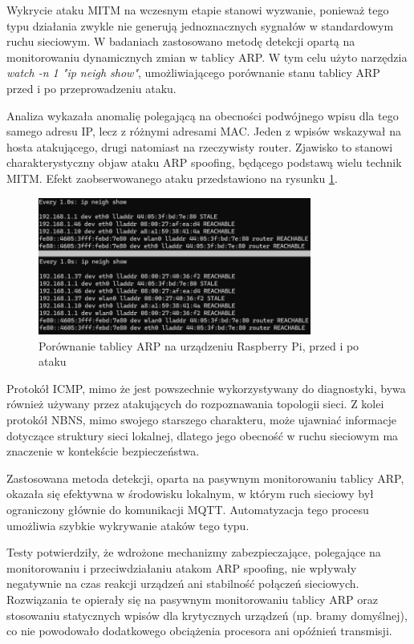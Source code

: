 Wykrycie ataku MITM na wczesnym etapie stanowi wyzwanie, ponieważ tego typu działania zwykle nie generują jednoznacznych sygnałów w standardowym ruchu sieciowym. W badaniach zastosowano metodę detekcji opartą na monitorowaniu dynamicznych zmian w tablicy ARP. W tym celu użyto narzędzia \textit{watch -n 1 "ip neigh show"}, umożliwiającego porównanie stanu tablicy ARP przed i po przeprowadzeniu ataku.

Analiza wykazała anomalię polegającą na obecności podwójnego wpisu dla tego samego adresu IP, lecz z różnymi adresami MAC. Jeden z wpisów wskazywał na hosta atakującego, drugi natomiast na rzeczywisty router. Zjawisko to stanowi charakterystyczny objaw ataku ARP spoofing, będącego podstawą wielu technik MITM. Efekt zaobserwowanego ataku przedstawiono na rysunku \ref{fig:Porównanie tablicy arp na urządzeniu Raspberry Pi, przed i po ataku}.
\begin{figure}[h]
    \centering
    \includegraphics[width=0.8\textwidth]{pictures/arp-mitm.png}
    \caption{Porównanie tablicy ARP na urządzeniu Raspberry Pi, przed i po ataku}
    \label{fig:Porównanie tablicy arp na urządzeniu Raspberry Pi, przed i po ataku}
\end{figure}

Protokół ICMP, mimo że jest powszechnie wykorzystywany do diagnostyki, bywa również używany przez atakujących do rozpoznawania topologii sieci. Z kolei protokół NBNS, mimo swojego starszego charakteru, może ujawniać informacje dotyczące struktury sieci lokalnej, dlatego jego obecność w ruchu sieciowym ma znaczenie w kontekście bezpieczeństwa.

Zastosowana metoda detekcji, oparta na pasywnym monitorowaniu tablicy ARP, okazała się efektywna w środowisku lokalnym, w którym ruch sieciowy był ograniczony głównie do komunikacji MQTT. Automatyzacja tego procesu umożliwia szybkie wykrywanie ataków tego typu.

Testy potwierdziły, że wdrożone mechanizmy zabezpieczające, polegające na monitorowaniu i przeciwdziałaniu atakom ARP spoofing, nie wpływały negatywnie na czas reakcji urządzeń ani stabilność połączeń sieciowych. Rozwiązania te opierały się na pasywnym monitorowaniu tablicy ARP oraz stosowaniu statycznych wpisów dla krytycznych urządzeń (np. bramy domyślnej), co nie powodowało dodatkowego obciążenia procesora ani opóźnień transmisji.

